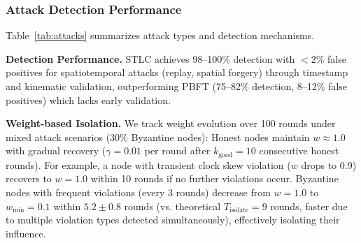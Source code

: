 \documentclass[lettersize,journal]{IEEEtran}
\newlength{\tblwidth}
\begin{document}
\subsubsection{Attack Detection Performance}

Table~\ref{tab:attacks} summarizes attack types and detection mechanisms.

\begin{table}[h]
\centering
\caption{Byzantine Attack Detection Performance}
\label{tab:attacks}
\small
{}
\end{table}

\textbf{Detection Performance.} STLC achieves 98--100\% detection with 
$<2\%$ false positives for spatiotemporal attacks (replay, spatial forgery) 
through timestamp and kinematic validation, outperforming PBFT (75--82\% 
detection, 8--12\% false positives) which lacks early validation.

\textbf{Weight-based Isolation.} We track weight evolution over 100 rounds 
under mixed attack scenarios (30\% Byzantine nodes): Honest nodes maintain 
$w \approx 1.0$ with gradual recovery ($\gamma=0.01$ per round after 
$k_{\text{good}}=10$ consecutive honest rounds). For example, a node with 
transient clock skew violation ($w$ drops to 0.9) recovers to $w=1.0$ 
within 10 rounds if no further violations occur. Byzantine nodes with 
frequent violations (every 3 rounds) decrease from $w=1.0$ to 
$w_{\min}=0.1$ within $5.2 \pm 0.8$ rounds (vs. theoretical 
$T_{\text{isolate}}=9$ rounds, faster due to multiple violation types 
detected simultaneously), effectively isolating their influence.
\end{document}
